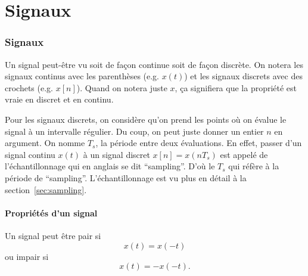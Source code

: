 

\newcommand{\fourier}{\mathcal{F}}
\newcommand{\laplace}{\mathcal{L}}
\newcommand{\laplacu}{\mathcal{F}_u}
\newcommand{\transfz}{\mathcal{Z}}
\newcommand{\transzu}{\mathcal{Z}_u}
\newcommand{\roc}{\mathrm{ROC}}




\part{Signaux}
\section{Signaux}
Un signal peut-être vu soit de façon continue soit de façon discrète.
On notera les signaux continus avec les parenthèses (e.g. $x(t)$)
et les signaux discrets avec des crochets (e.g. $x[n]$).
Quand on notera juste $x$, ça signifiera que la propriété est vraie
en discret et en continu.

Pour les signaux discrets, on considère qu'on prend les points où on
évalue le signal à un intervalle régulier.
Du coup, on peut juste donner un entier $n$ en argument.
On nomme $T_s$, la période entre deux évaluations.
En effet, passer d'un signal continu $x(t)$ à un signal discret
$x[n] = x(nT_s)$ est appelé de l'échantillonnage qui en anglais se dit
``sampling''. D'où le $T_s$ qui réfère à la période de ``sampling''.
L'échantillonnage est vu plus en détail à la section~\ref{sec:sampling}.

\subsection{Propriétés d'un signal}
Un signal peut être pair si
\[ x(t) = x(-t) \]
ou impair si
\[ x(t) = -x(-t). \]

